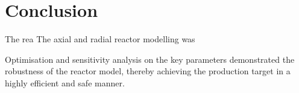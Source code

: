 \section{Conclusion} \label{sec:conclusion}
The rea
The axial and radial reactor modelling was 

Optimisation and sensitivity analysis on the key parameters demonstrated the robustness of the reactor model, thereby achieving the production target in a highly efficient and safe manner. 